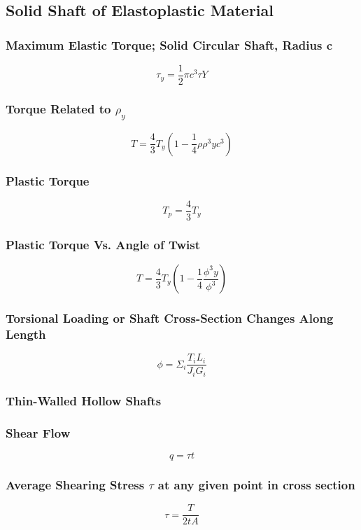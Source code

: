 \documentclass[10pt,landscape]{article}
\begin{document}
\begin{multicols}{3}
\subsection{Solid Shaft of Elastoplastic Material}
\subsubsection{Maximum Elastic Torque; Solid Circular Shaft, Radius c}
\begin{equation}
    \tau_y=\frac{1}{2}\pi c^3\tau Y
\end{equation}
\subsubsection{Torque Related to $\rho_y$}
\begin{equation}
    T=\frac{4}{3}T_y(1-\frac{1}{4}\rho{\rho^3y}{c^3})
\end{equation}
\subsubsection{Plastic Torque}
\begin{equation}
    T_p=\frac{4}{3}T_y
\end{equation}
\subsubsection{Plastic Torque Vs. Angle of Twist}
\begin{equation}
    T=\frac{4}{3}T_y(1-\frac{1}{4}\frac{\phi^3y}{\phi^3})
\end{equation}
\subsubsection{Torsional Loading or Shaft Cross-Section Changes Along Length}
\begin{equation}
    \phi=\Sigma_i\frac{T_iL_i}{J_iG_i}
\end{equation}
\subsubsection{Thin-Walled Hollow Shafts}
\subsubsection{Shear Flow}
\begin{equation}
    q=\tau t
\end{equation}
\subsubsection{Average Shearing Stress $\tau$ at any given point in cross section}
\begin{equation}
    \tau=\frac{T}{2tA}
\end{equation}


\end{multicols}
\end{document}
